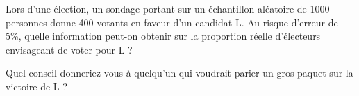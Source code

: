 
\begin{exercice}\label{exosmath-0441}


Lors d'une élection, un sondage portant sur un échantillon aléatoire de 1000 personnes donne 400 votants en faveur d’un candidat L. Au risque d'erreur de 5\%, quelle information peut-on obtenir sur la proportion réelle d'électeurs envisageant de voter pour L ?

Quel conseil donneriez-vous à quelqu'un qui voudrait parier un gros paquet sur la victoire de L ?

\end{exercice}
